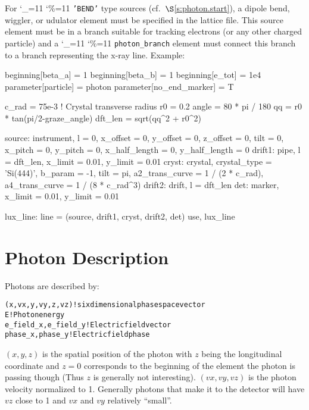 \documentclass[11pt]{article}
\newcommand\ttcmd{\begingroup\catcode`\_=11 \catcode`\%=11 \dottcmd}
\newcommand\dottcmd[1]{\texttt{#1}\endgroup}
\newcommand{\vn}{\ttcmd}
\newcommand{\sref}[1]{$\S$\ref{#1}}
\newenvironment{example}
  {\vspace{\ExBeg} \begin{alltt}}
  {\end{alltt} \vspace{\ExEnd}}
\newlength{\ExBeg}
\newlength{\ExEnd}
\begin{document}
For \vn{'BEND'} type sources (cf.~\sref{s:photon.start}), a dipole
bend, wiggler, or udulator element must be specified in the lattice
file. This source element must be in a branch suitable for tracking
electrons (or any other charged particle) and a \vn{photon_branch}
element must connect this branch to a branch representing the x-ray
line. Example:
\begin{listing}{1}

beginning[beta_a] = 1
beginning[beta_b] = 1
beginning[e_tot] = 1e4
parameter[particle] = photon
parameter[no_end_marker] = T

c_rad = 75e-3  ! Crystal transverse radius 
r0 = 0.2
angle  = 80 * pi / 180
qq = r0 * tan(pi/2-graze_angle)
dft_len = sqrt(qq^2 + r0^2)

source: instrument, l = 0, x_offset = 0, y_offset = 0, z_offset = 0, tilt = 0,
        x_pitch = 0, y_pitch = 0, x_half_length = 0, y_half_length = 0
drift1: pipe, l = dft_len, x_limit = 0.01, y_limit = 0.01
cryst: crystal, crystal_type = 'Si(444)', b_param = -1, tilt = pi, 
        a2_trans_curve = 1 / (2 * c_rad), a4_trans_curve = 1 / (8 * c_rad^3)
drift2: drift, l = dft_len
det: marker, x_limit = 0.01, y_limit = 0.01

lux_line: line = (source, drift1, cryst, drift2, det)
use, lux_line
\end{listing}

\section{Photon Description}
\label{s:photon.descrip}

Photons are described by:
\begin{example}
  (x, vx, y, vy, z, vz)   ! six dimensional phase space vector 
  E                       ! Photon energy 
  e_field_x, e_field_y    ! Electric field vector
  phase_x, phase_y        ! Electric field phase 
\end{example}
$(x, y, z)$ is the spatial position of the photon with $z$ being the
longitudinal coordinate and $z=0$ corresponds to the beginning of the
element the photon is passing though (Thus $z$ is generally not
interesting). $(vx, vy, vz)$ is the photon velocity normalized to 1.
Generally photons that make it to the detector will have $vz$ close to
1 and $vx$ and $vy$ relatively ``small''.

\end{document}
